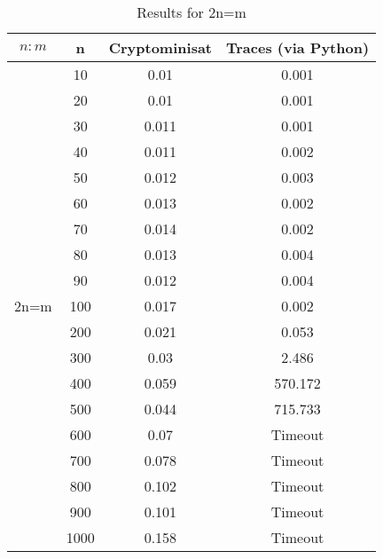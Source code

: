 \begin{table}
	\centering
	\begin{tabular}{|c|c|c|c|}
		\hline
		$n:m$ & n & Cryptominisat & Traces (via Python) \\ \hline
		\multirow{19}{*}{2n=m} 
		& 10 & 0.01 & 0.001\\
		& 20 & 0.01 & 0.001\\
		& 30 & 0.011 & 0.001\\
		& 40 & 0.011 & 0.002\\
		& 50 & 0.012 & 0.003\\
		& 60 & 0.013 & 0.002\\
		& 70 & 0.014 & 0.002\\
		& 80 & 0.013 & 0.004\\
		& 90 & 0.012 & 0.004\\
		& 100 & 0.017 & 0.002\\
		& 200 & 0.021 & 0.053\\
		& 300 & 0.03 & 2.486\\
		& 400 & 0.059 & 570.172\\
		& 500 & 0.044 & 715.733\\
		& 600 & 0.07 & Timeout\\
		& 700 & 0.078 & Timeout\\
		& 800 & 0.102 & Timeout\\
		& 900 & 0.101 & Timeout\\
		& 1000 & 0.158 & Timeout\\
		\hline
	\end{tabular}
	\caption{Results for 2n=m}
\end{table}